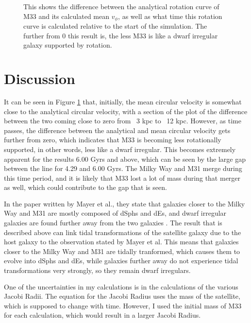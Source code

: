 \documentclass[trackchanges, twocolumn]{aastex7}
\begin{document}
\begin{figure}[ht!]
\caption{ This shows the difference between the analytical rotation curve of M33 and its calculated mean  \(v_\phi\), as well as what time this rotation curve is calculated relative to the start of the simulation. The further from 0 this result is, the less M33 is like a dwarf irregular galaxy supported by rotation.
\label{fig:M33Vphi}}
\end{figure}


\section{Discussion}


It can be seen in Figure \ref{fig:M33Vphi} that, initially, the mean circular velocity is somewhat close to the analytical circular velocity, with a section of the plot of the difference between the two coming close to zero from ~3 kpc to ~12 kpc. However, as time passes, the difference between the analytical and mean circular velocity gets further from zero, which indicates that M33 is becoming less rotationally supported, in other words, less like a dwarf irregular. This becomes extremely apparent for the results 6.00 Gyrs and above, which can be seen by the large gap between the line for 4.29 and 6.00 Gyrs. The Milky Way and M31 merge during this time period, and it is likely that M33 lost a lot of mass during that merger as well, which could contribute to the gap that is seen.

In the paper written by Mayer et al., they state that galaxies closer to the Milky Way and M31 are mostly composed of dSphs and dEs, and dwarf irregular galaxies are found further away from the two galaxies \citep{Mayer2001}. The result that is described above can link tidal transformations of the satellite galaxy due to the host galaxy to the observation stated by Mayer et al. This means that galaxies closer to the Milky Way and M31 are tidally tranformed, which causes them to evolve into dSphs and dEs, while galaxies further away do not experience tidal transformations very strongly, so they remain dwarf irregulars. 

One of the uncertainties in my calculations is in the calculations of the various Jacobi Radii. The equation for the Jacobi Radius uses the mass of the satellite, which is supposed to change with time. However, I used the initial mass of M33 for each calculation, which would result in a larger Jacobi Radius.

{}

\end{document}
